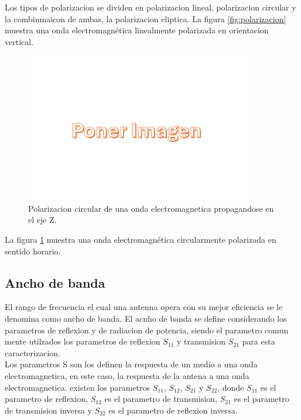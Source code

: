 Los tipos de polarizacion se dividen en polarizacion lineal, polarizacion circular y la combinmaicon de ambas, la polarizacion eliptica. La figura \ref{fig:polarizacion} muestra una onda electromagnética linealmente polarizada en orientacion vertical.\\

\begin{figure}
    \centering
    \includegraphics[width = 10cm]{img/imagen.png}
    \caption{Polarizacion circular de una onda electromagnetica propagandose en el eje Z.}
    \label{fig:polarizacion2}
\end{figure}

La figura \ref{fig:polarizacion2} muestra una onda electromagnética circularmente polarizada en sentido horario.\\



\subsection{Ancho de banda}

El rango de frecuencia el cual una antenna opera con su mejor eficiencia se le denomina como ancho de banda. El acnho de banda se define considerando los parametros de reflexion y de radiacion de potencia, siendo el parametro comun mente utilzados los parametros de reflexion $S_{11}$ y transmision $S_{21}$ para esta caracterizacion.\\

Los parametros S son los definen la respuesta de un medio a una onda electromagnetica, en este caso, la respuesta de la antena a una onda electromagnetica. existen los parametros $S_{11}$, $S_{12}$, $S_{21}$ y $S_{22}$, donde $S_{11}$ es el parametro de reflexion, $S_{12}$ es el parametro de transmision, $S_{21}$ es el parametro de transmision inversa y $S_{22}$ es el parametro de reflexion inversa.\\


